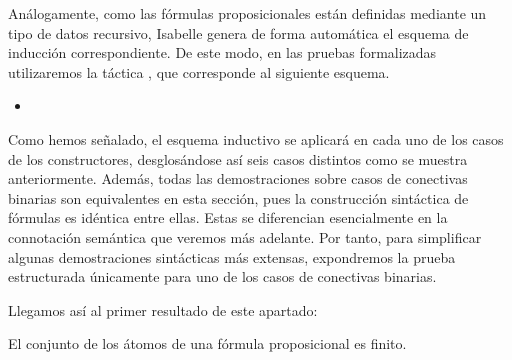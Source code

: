 \begin{isabellebody}
\begin{isamarkuptext}
  Análogamente, como las fórmulas proposicionales están definidas 
  mediante un tipo de datos recursivo, Isabelle genera de forma 
  automática el esquema de inducción correspondiente. De este modo, en 
  las pruebas formalizadas utilizaremos la táctica , 
  que corresponde al siguiente esquema.

  \begin{itemize}
    \item[] 
  \end{itemize} 

  Como hemos señalado, el esquema inductivo se aplicará en cada uno de 
  los casos de los constructores, desglosándose así seis casos distintos 
  como se muestra anteriormente. Además, todas las demostraciones sobre 
  casos de conectivas binarias son equivalentes en esta sección, pues la 
  construcción sintáctica de fórmulas es idéntica entre ellas. Estas se 
  diferencian esencialmente en la connotación semántica que veremos más 
  adelante. Por tanto, para simplificar algunas demostraciones 
  sintácticas más extensas, expondremos la prueba estructurada 
  únicamente para uno de los casos de conectivas binarias.

  Llegamos así al primer resultado de este apartado:

  \begin{lema}
    El conjunto de los átomos de una fórmula proposicional es finito.
  \end{lema}


\end{isamarkuptext}
\end{isabellebody}
